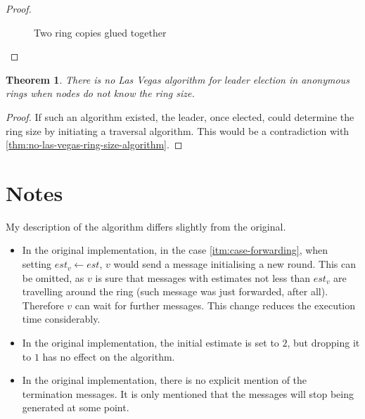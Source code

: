 \documentclass[a4paper,12pt]{article}
\newtheorem{theorem}{Theorem}
\begin{document}
\begin{proof}
\begin{figure}
\caption{Two ring copies glued together}\label{fig:ring}
\end{figure}
\end{proof}

\begin{theorem}
There is no Las Vegas algorithm for leader election in anonymous rings when nodes do not know the ring size.
\end{theorem}
\begin{proof}
If such an algorithm existed, the leader, once elected, could determine the ring size by initiating a traversal algorithm. This would be a contradiction with \ref{thm:no-las-vegas-ring-size-algorithm}.
\end{proof}

\section{Notes}
My description of the algorithm differs slightly from the original.

\begin{itemize}
    \item In the original implementation, in the case \ref{itm:case-forwarding}, when setting $est_v \leftarrow est$, $v$ would send a message initialising a new round. This can be omitted, as $v$ is sure that messages with estimates not less than $est_v$ are travelling around the ring (such message was just forwarded, after all). Therefore $v$ can wait for further messages. This change reduces the execution time considerably.
    \item In the original implementation, the initial estimate is set to $2$, but dropping it to $1$ has no effect on the algorithm.
    \item In the original implementation, there is no explicit mention of the termination messages. It is only mentioned that the messages will stop being generated at some point.
\end{itemize}

\printbibliography
\end{document}
